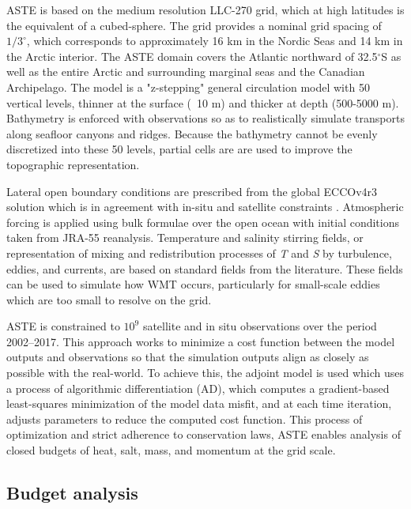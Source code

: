 \documentclass[a4paper,12pt]{article}
\begin{document}
    ASTE is based on the medium resolution LLC-270 grid, which at high latitudes is the equivalent of a cubed-sphere. The grid provides a nominal grid spacing of $1/3^\circ$, which corresponds to approximately 16 km in the Nordic Seas and 14 km in the Arctic interior. The ASTE domain covers the Atlantic northward of 32.5$^\circ$S as well as the entire Arctic and surrounding marginal seas and the Canadian Archipelago. The model is a "z-stepping" general circulation model with 50 vertical levels, thinner at the surface (~10 m) and thicker at depth (500-5000 m). Bathymetry is enforced with observations so as to realistically simulate transports along seafloor canyons and ridges. Because the bathymetry cannot be evenly discretized into these 50 levels, partial cells are are used to improve the topographic representation.

    Lateral open boundary conditions are prescribed from the global ECCOv4r3 solution which is in agreement with in-situ and satellite constraints \cite{Nguyen2021}. Atmospheric forcing is applied using bulk formulae over the open ocean with initial conditions taken from JRA-55 reanalysis. Temperature and salinity stirring fields, or representation of mixing and redistribution processes of \emph{T} and \emph{S} by turbulence, eddies, and currents, are based on standard fields from the literature. These fields can be used to simulate how WMT occurs, particularly for small-scale eddies which are too small to resolve on the grid. 

    ASTE is constrained to $10^9$ satellite and in situ observations over the period 2002--2017. This approach works to minimize a cost function between the model outputs and observations so that the simulation outputs align as closely as possible with the real-world. To achieve this, the adjoint model is used which uses a process of algorithmic differentiation (AD), which computes a gradient-based least-squares minimization of the model data misfit, and at each time iteration, adjusts parameters to reduce the computed cost function. This process of optimization and strict adherence to conservation laws, ASTE enables analysis of closed budgets of heat, salt, mass, and momentum at the grid scale.

    \subsection{Budget analysis}
\end{document}

